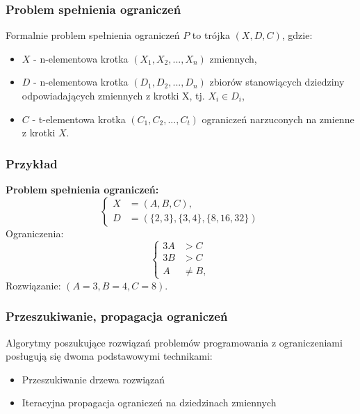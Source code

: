 \documentclass{beamer}
\begin{document}
    \begin{frame}
        \frametitle{Problem spełnienia ograniczeń}
        Formalnie problem spełnienia ograniczeń $P$ to trójka $(X, D, C)$, gdzie:
        \begin{itemize}
            \item $X$ - n-elementowa krotka $(X_1, X_2, ... , X_n)$ zmiennych,
            \item $D$ - n-elementowa krotka $(D_1, D_2, ... , D_n)$ zbiorów stanowiących dziedziny odpowiadających zmiennych z
                        krotki X, tj. $X_i \in D_i$,
            \item $C$ - t-elementowa krotka $(C_1, C_2, ... , C_t)$ ograniczeń narzuconych na zmienne z krotki $X$.
        \end{itemize}
    \end{frame}
    \begin{frame}
    	\frametitle{Przykład}
        \begin{example}
            \textbf{Problem spełnienia ograniczeń:}
            \begin{equation}
                \left\{
                    \begin{aligned}
                        X &= (A, B, C), \\
                        D &= (\{2,3\}, \{3,4\}, \{8,16,32\})
                    \end{aligned}
                \right.
            \end{equation}
            Ograniczenia:
            \begin{equation}
                \left\{
                    \begin{aligned}
                        3A &> C \\
                        3B &> C \\
                        A &\neq B,
                    \end{aligned}
                \right.
            \end{equation}
            Rozwiązanie: $(A=3, B=4, C=8)$.
            \end{example}
    \end{frame}
    \begin{frame}
        \frametitle{Przeszukiwanie, propagacja ograniczeń}
        Algorytmy poszukujące rozwiązań problemów programowania z ograniczeniami
        posługują się dwoma podstawowymi technikami:
        \begin{itemize}
            \item Przeszukiwanie drzewa rozwiązań
            \item Iteracyjna propagacja ograniczeń na dziedzinach zmiennych
        \end{itemize}
    \end{frame}
\end{document}

